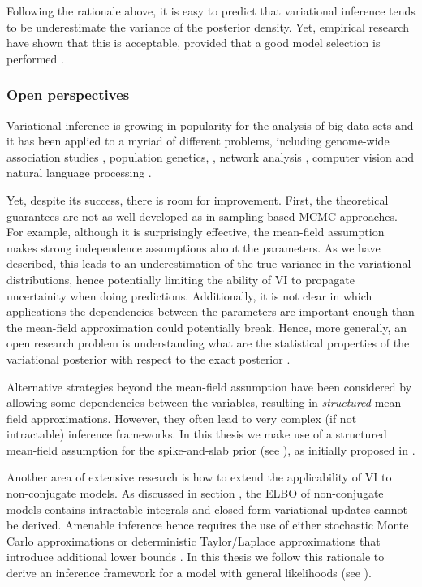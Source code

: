 Following the rationale above, it is easy to predict that variational inference tends to be underestimate the variance of the posterior density. Yet, empirical research have shown that this is acceptable, provided that a good model selection is performed \cite{Blei2006}.


\subsubsection{Open perspectives}  \label{section:bayes_open_perspectives}
Variational inference is growing in popularity for the analysis of big data sets and it has been applied to a myriad of different problems, including genome-wide association studies \cite{Carbonetto2012}, population genetics, \cite{Raj2014}, network analysis \cite{Sanguinetti2006}, computer vision \cite{Likas2004} and natural language processing \cite{Blei2003}.

Yet, despite its success, there is room for improvement. First, the theoretical guarantees are not as well developed as in sampling-based MCMC approaches\cite{Blei2016,Zhang2017,Nakajima2007}. For example, although it is surprisingly effective, the mean-field assumption makes strong independence assumptions about the parameters. As we have described, this leads to an underestimation of the true variance in the variational distributions, hence potentially limiting the ability of VI to propagate uncertainity when doing predictions. Additionally, it is not clear in which applications the dependencies between the parameters are important enough than the mean-field approximation could potentially break. Hence, more generally, an open research problem is understanding what are the statistical properties of the variational posterior with respect to the exact posterior \cite{Blei2016,Zhang2017}.

Alternative strategies beyond the mean-field assumption have been considered by allowing some dependencies between the variables, resulting in \textit{structured} mean-field approximations\cite{Barber1998,Lawrence1996,Hoffman2014}. However, they often lead to very complex (if not intractable) inference frameworks. In this thesis we make use of a structured mean-field assumption for the spike-and-slab prior (see ), as initially proposed in \cite{Titsias2011}.

Another area of extensive research is how to extend the applicability of VI to non-conjugate models. As discussed in section , the ELBO of non-conjugate models contains intractable integrals and closed-form variational updates cannot be derived. Amenable inference hence requires the use of either stochastic Monte Carlo approximations or deterministic Taylor/Laplace approximations that introduce additional lower bounds \cite{Zhang2017,Seeger2012,Khan2017}. In this thesis we follow this rationale to derive an inference framework for a model with general likelihoods (see ).

